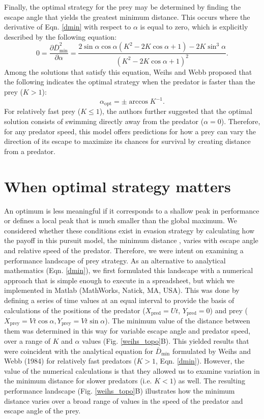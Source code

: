 \documentclass[12pt]{article}
\def\d{\partial}
\newcommand{\ol}{\overline}
\begin{document}
Finally, the optimal strategy for the prey may be determined by finding the escape angle that yields the greatest minimum distance. This occurs where the derivative of Eqn. \ref{dmin} with respect to $\alpha$ is equal to zero, which is explicitly described by the following equation:
%
\begin{equation}
0 = \frac{\d \ol{D}^2_{\text{min}}}{\d \alpha} = \frac{2\sin\alpha \cos\alpha (K^2 -2 K \cos\alpha+1)-2 K \sin^3\alpha}{(K^2-2 K \cos\alpha + 1)^2}. 
\label{eq37weihs}
\end{equation}
%
Among the solutions that satisfy this equation, Weihs and Webb proposed that the following indicates the optimal strategy when the predator is faster than the prey ($K>1$):
%
\begin{equation}
\alpha_{\text{opt}} = \pm \arccos K^{-1}. 
\label{K>1}
\end{equation}
%
For relatively fast prey ($K\leq1$), the authors further suggested that the optimal solution consists of swimming directly away from the predator ($\alpha = 0$). Therefore, for any predator speed, this model offers predictions for how a prey can vary the direction of its escape to maximize its chances for survival by creating distance from a predator. 

\section{When optimal strategy matters}

An optimum is less meaningful if it corresponds to a shallow peak in performance or defines a local peak that is much smaller than the global maximum. We considered whether these conditions exist in evasion strategy by calculating how the payoff in this pursuit model, the minimum distance \citep{Weihs:1984tb}, varies with escape angle and relative speed of the predator. Therefore, we were intent on examining a performance landscape of prey strategy. As an alternative to analytical mathematics (Eqn. \ref{dmin}), we first formulated this landscape with a numerical approach that is simple enough to execute in a spreadsheet, but which we implemented in Matlab (MathWorks, Natick, MA, USA). This was done by defining a series of time values at an equal interval to provide the basis of calculations of the positions of the predator ($X_{\text{pred}} = Ut$, $Y_{\text{pred}} = 0$) and prey ($X_{\text{prey}}=Vt\cos\alpha,Y_{\text{prey}}=Vt\sin\alpha$). The minimum value of the distance between them was determined in this way for variable escape angle and predator speed, over a range of $K$ and $\alpha$ values (Fig. \ref{weihs_topo}B). This yielded results that were coincident with the analytical equation for $\ol D_{\text{min}}$ formulated by Weihs and Webb (1984) for relatively fast predators ($K>1$, Eqn. \ref{dmin}). However, the value of the numerical calculations is that they allowed us to examine variation in the minimum distance for slower predators (i.e. $K<1$) as well. The resulting performance landscape (Fig. \ref{weihs_topo}B) illustrates how the minimum distance varies over a broad range of values in the speed of the predator and escape angle of the prey.
\end{document}
